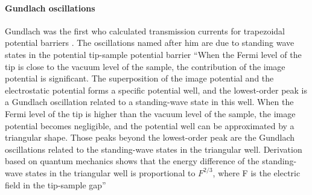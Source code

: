 \paragraph{Gundlach oscillations}
Gundlach was the first who calculated transmission currents for trapezoidal potential barriers \cite{gundlach_zur_1966}. The oscillations named after him are due to standing wave states in the potential tip-sample potential barrier \cite{binnig_tunneling_1985,becker_electron_1985}
``When the Fermi level of the tip is close to the vacuum level of  the  sample,  the  contribution  of  the  image  potential  is significant. The superposition of the  image  potential  and the electrostatic  potential forms a specific potential well, and the lowest-order peak is a Gundlach oscillation related to a standing-wave state in this well. When the Fermi level of the tip is higher than the vacuum level of the sample, the image potential becomes negligible, and the potential well can be  approximated  by a triangular  shape. Those peaks beyond the lowest-order peak are the Gundlach oscillations related to the standing-wave states in the triangular well. Derivation  based  on  quantum  mechanics  shows  that  the energy difference of the standing-wave states in the triangular  well  is  proportional  to $F^{2/3}$,  where F is  the electric field in the tip-sample gap''\cite{lin_manifestation_2007}

